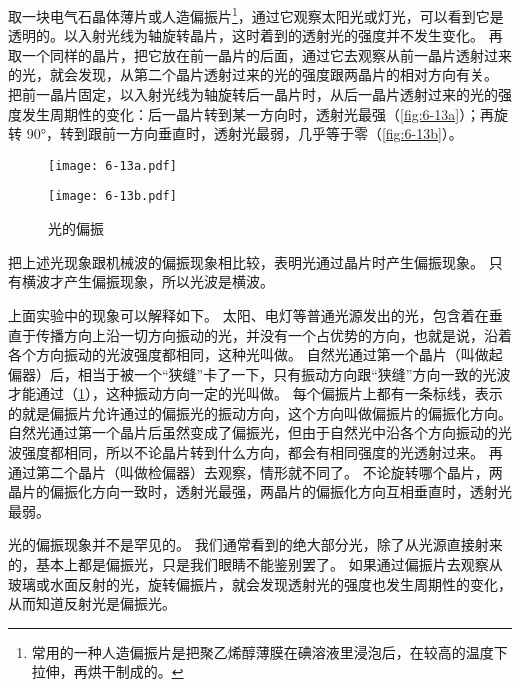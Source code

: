 取一块电气石晶体薄片或人造偏振片\footnote{常用的一种人造偏振片是把聚乙烯醇薄膜在碘溶液里浸泡后，在较高的温度下拉伸，再烘干制成的。}，通过它观察太阳光或灯光，可以看到它是透明的。以入射光线为轴旋转晶片，这时着到的透射光的强度并不发生变化。
再取一个同样的晶片，把它放在前一晶片的后面，通过它去观察从前一晶片透射过来的光，就会发现，从第二个晶片透射过来的光的强度跟两晶片的相对方向有关。
把前一晶片固定，以入射光线为轴旋转后一晶片时，从后一晶片透射过来的光的强度发生周期性的变化：后一晶片转到某一方向时，透射光最强（\cref{fig:6-13a}）；再旋转 \ang{90}，转到跟前一方向垂直时，透射光最弱，几乎等于零（\cref{fig:6-13b}）。
\begin{figure}
  \begin{minipage}{0.1\linewidth}\raggedleft
    \subcaption{}\label{fig:6-13a}
  \end{minipage}%
  \begin{minipage}{0.6\linewidth}\centering
    \texttt{[image: 6-13a.pdf]}
  \end{minipage}\par\medskip
  \begin{minipage}{0.1\linewidth}\raggedleft
    \subcaption{}\label{fig:6-13b}
  \end{minipage}%
  \begin{minipage}{0.6\linewidth}\centering
    \texttt{[image: 6-13b.pdf]}
  \end{minipage}
  \caption{光的偏振}\label{fig:6-13}
\end{figure}

把上述光现象跟机械波的偏振现象相比较，表明光通过晶片时产生偏振现象。
只有横波才产生偏振现象，所以光波是横波。

上面实验中的现象可以解释如下。
太阳、电灯等普通光源发出的光，包含着在垂直于传播方向上沿一切方向振动的光，并没有一个占优势的方向，也就是说，沿着各个方向振动的光波强度都相同，这种光叫做。
自然光通过第一个晶片（叫做起偏器）后，相当于被一个“狭缝”卡了一下，只有振动方向跟“狭缝”方向一致的光波才能通过（\cref{fig:6-13}），这种振动方向一定的光叫做。
每个偏振片上都有一条标线，表示的就是偏振片允许通过的偏振光的振动方向，这个方向叫做偏振片的偏振化方向。
自然光通过第一个晶片后虽然变成了偏振光，但由于自然光中沿各个方向振动的光波强度都相同，所以不论晶片转到什么方向，都会有相同强度的光透射过来。
再通过第二个晶片（叫做检偏器）去观察，情形就不同了。
不论旋转哪个晶片，两晶片的偏振化方向一致时，透射光最强，两晶片的偏振化方向互相垂直时，透射光最弱。

光的偏振现象并不是罕见的。
我们通常看到的绝大部分光，除了从光源直接射来的，基本上都是偏振光，只是我们眼睛不能鉴别罢了。
如果通过偏振片去观察从玻璃或水面反射的光，旋转偏振片，就会发现透射光的强度也发生周期性的变化，从而知道反射光是偏振光。

